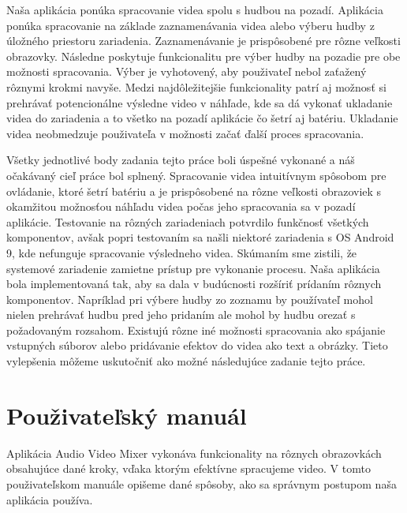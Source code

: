 \documentclass[12pt, oneside]{book}
\makeatletter
\newcommand*\removedotbetweenchapterandsection{%
  \renewcommand\thesection{\thechapter\@arabic\c@section}%
}
\makeatother
\begin{document}
Naša aplikácia ponúka spracovanie videa spolu s hudbou na pozadí. Aplikácia ponúka spracovanie na základe zaznamenávania videa alebo výberu hudby z úložného priestoru zariadenia. Zaznamenávanie je prispôsobené pre rôzne veľkosti obrazovky. Následne poskytuje funkcionalitu pre výber hudby na pozadie pre obe možnosti spracovania. Výber je vyhotovený, aby použivateľ nebol zaťažený rôznymi krokmi navyše. Medzi najdôležitejšie funkcionality patrí aj možnosť si prehrávať potencionálne výsledne video v náhľade, kde sa dá vykonať ukladanie videa do zariadenia a to všetko na pozadí aplikácie čo šetrí aj batériu. Ukladanie videa neobmedzuje použivateľa v možnosti začať ďalší proces spracovania.

Všetky jednotlivé body zadania tejto práce boli úspešné vykonané a náš očakávaný cieľ práce bol splnený. Spracovanie videa intuitívnym spôsobom pre ovládanie, ktoré šetrí batériu a je prispôsobené na rôzne veľkosti obrazoviek s okamžitou možnosťou náhľadu videa počas jeho spracovania sa v pozadí aplikácie. Testovanie na rôzných zariadeniach potvrdilo funkčnosť všetkých komponentov, avšak popri testovaním sa našli niektoré zariadenia s OS Android 9, kde nefunguje spracovanie výsledneho videa. Skúmaním sme zistili, že systemové zariadenie zamietne prístup pre vykonanie procesu.  Naša aplikácia bola implementovaná tak, aby sa dala v budúcnosti rozšíriť prídaním rôznych komponentov. Napríklad pri výbere hudby zo zoznamu by používateľ mohol nielen prehrávať hudbu pred jeho pridaním ale mohol by hudbu orezať s požadovaným rozsahom. Existujú rôzne iné možnosti spracovania ako spájanie vstupných súborov alebo pridávanie efektov do videa ako text a obrázky. Tieto vylepšenia môžeme uskutočniť ako možné následujúce zadanie tejto práce. 



\newpage




\newpage

\makeatletter
{}

\appendix


\removedotbetweenchapterandsection

\newpage

\chapter{Použivateľský manuál}

\hspace{15pt} Aplikácia Audio Video Mixer vykonáva funkcionality na rôznych obrazovkách obsahujúce dané kroky, vďaka ktorým efektívne spracujeme video. V tomto použivateľskom manuále opišeme dané spôsoby, ako sa správnym postupom naša aplikácia používa.
\end{document}
